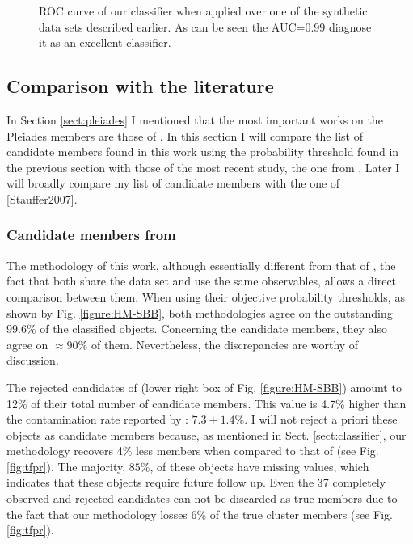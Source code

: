 \begin{figure}[!htp]
\begin{center}
\caption{ROC curve of our classifier when applied over one of the synthetic data sets described earlier. As can be seen the AUC=0.99 diagnose it as an excellent classifier.}
\label{figure:ROC}
\end{center}
\end{figure}

 
\subsection{Comparison with the literature}
In Section \ref{sect:pleiades} I mentioned that the most important works on the Pleiades members are those of \citet{Stauffer2007,Lodieu2012,Sarro2014,Bouy2015}. In this section I will compare the list of candidate members found in this work using the probability threshold found in the previous section with those of the most recent study, the one from \citet{Bouy2015}. Later I will broadly compare my list of candidate members with the one of \ref{Stauffer2007}. 

\subsubsection{Candidate members from \citet{Bouy2015}}
\label{sect:comparisonBouy}
The methodology of this work, although essentially different from that of \citet{Bouy2015}, the fact that both share the data set and use the same observables, allows a direct comparison between them. When using their objective probability thresholds, as shown by Fig. \ref{figure:HM-SBB}, both methodologies agree on the outstanding $99.6$\% of the classified objects. Concerning the candidate members, they also agree on $\approx 90\%$ of them. Nevertheless, the discrepancies are worthy of discussion.

The rejected candidates of \citet{Bouy2015} (lower right box of Fig. \ref{figure:HM-SBB}) amount to 12\% of their total number of candidate members. This value is 4.7\% higher than the contamination rate reported by \citet{Sarro2014}: $7.3\pm1.4$\%. I will not reject a priori these objects as candidate members because, as mentioned in Sect. \ref{sect:classifier}, our methodology recovers 4\% less members when compared to that of \citet{Sarro2014}(see Fig. \ref{fig:tfpr}). The majority, $85\%$, of these objects have missing values, which indicates that these objects require future follow up. Even the 37 completely observed and rejected candidates can not be discarded as true members due to the fact that our methodology losses 6\% of the true cluster members (see Fig. \ref{fig:tfpr}).  

